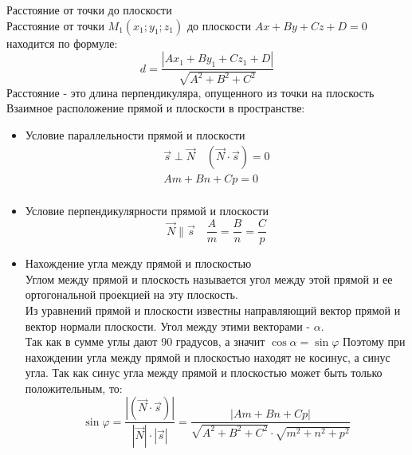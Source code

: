 \documentclass[a4paper,14pt]{extreport} %
\begin{document}
      Расстояние от точки до плоскости\\
      Расстояние от точки $M_1\left(x_1 ; y_1 ; z_1\right)$ до плоскости $A x+B y+C z+D=0 \quad$ находится по формуле:
      $$
      d=\frac{\left|A x_1+B y_1+C z_1+D\right|}{\sqrt{A^2+B^2+C^2}}
      $$
      Расстояние - это длина перпендикуляра, опущенного из точки на плоскость 
      Взаимное расположение прямой и плоскости в пространстве:
      \begin{itemize}
        \item Условие параллельности прямой и плоскости
        $$
        \begin{array}{ll}
        \vec{s} \perp \vec{N} \quad(\vec{N} \cdot \vec{s})=0 \\
        A m+B n+C p=0\\
        \end{array}
        $$
        \item Условие перпендикулярности прямой и плоскости
        $$
        \vec{N} \| \vec{s} \quad \frac{A}{m}=\frac{B}{n}=\frac{C}{p}
        $$
      \item Нахождение угла между прямой и плоскостью\\
        Углом между прямой и плоскость называется угол между этой прямой и ее ортогональной проекцией на эту плоскость.\\
        Из уравнений прямой и плоскости известны направляющий вектор прямой и вектор нормали плоскости.
        Угол между этими векторами - $\alpha$.\\
        Так как в сумме углы дают 90 градусов, а значит $\cos \alpha=\sin \varphi$ Поэтому при нахождении угла между прямой и плоскостью находят не косинус, а синус угла. Так как синус угла между прямой и плоскостью может быть только положительным, то:
        $$
        \sin \varphi=\frac{|(\vec{N} \cdot \vec{s})|}{|\vec{N}| \cdot|\vec{s}|}=\frac{|A m+B n+C p|}{\sqrt{A^2+B^2+C^2} \cdot \sqrt{m^2+n^2+p^2}}
        $$
      \end{itemize}
\end{document}
